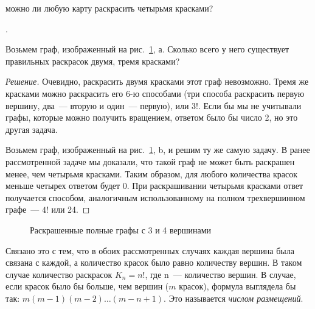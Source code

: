 \documentclass[russian]{lecture-notes}
\begin{document}
    \begin{conjecture} можно ли любую карту раскрасить четырьмя красками?
    \end{conjecture}
    \begin{example*}.

    Возьмем граф, изображенный на рис.~\ref{fig:counting}, а. Сколько всего у него существует правильных раскрасок двумя, тремя красками?

    \begin{proof}[Решение]
        Очевидно, раскрасить двумя красками этот граф невозможно. Тремя же красками можно раскрасить его 6-ю способами (три способа раскрасить первую вершину, два~--- вторую и один~--- первую), или $3!$. Если бы мы не учитывали графы, которые можно получить вращением, ответом было бы число 2, но это другая задача.

        Возьмем граф, изображенный на рис.~\ref{fig:counting}, b, и решим ту же самую задачу. В ранее рассмотренной задаче мы доказали, что такой граф не может быть раскрашен менее, чем четырьмя красками. Таким образом, для любого количества красок меньше четырех ответом будет 0. При раскрашивании четырьмя красками ответ получается способом, аналогичным использованному на полном трехвершинном графе~--- $4!$ или 24.
    \end{proof}

    \begin{figure}
        \centering
        \caption{Раскрашенные полные графы с 3 и 4 вершинами}
        \label{fig:counting}
    \end{figure}
    Связано это с тем, что в обоих рассмотренных случаях каждая вершина была связана с каждой, а количество красок было равно количеству вершин. В таком случае количество раскрасок $K_n = n!$, где n~--- количество вершин. В случае, если красок было бы больше, чем вершин ($m$ красок), формула выглядела бы так: $m(m-1)(m-2)\ldots(m-n+1)$. Это называется {\em числом размещений}.
    \vspace {0.25 cm}


\end{example*}
\end{document}
